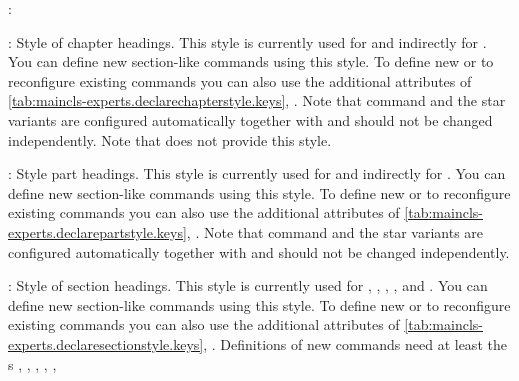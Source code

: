 \begin{labeling}{:}
\item[\PValue{chapter}:] Style of chapter headings. This style is currently used
  for  and indirectly for
  . You can define new
  section-like commands using this style. To define new or to reconfigure
  existing commands you can also use the additional attributes of
  \autoref{tab:maincls-experts.declarechapterstyle.keys},
  .
  Note that command  and the
  star variants are configured automatically together with
   and should not be changed independently. Note
  that  does not
  provide this style.
\item[\PValue{part}:] Style part headings. This style is
  currently used for  and indirectly
  for . You can define new
  section-like commands using this style. To define new or to reconfigure
  existing commands you can also use the additional attributes of
  \autoref{tab:maincls-experts.declarepartstyle.keys},
  .
  Note that command  and the
  star variants are configured automatically together with
   and should not be changed independently.
\item[\PValue{section}:] Style of section headings. This style is currently
  used for ,
  ,
  ,
  , and
  . You can define
  new section-like commands using this style. To define new or to reconfigure
  existing commands you can also use the additional attributes of
  \autoref{tab:maincls-experts.declaresectionstyle.keys},
  . Definitions of
  new commands need at least the s ,
  , , , ,

\end{labeling}
